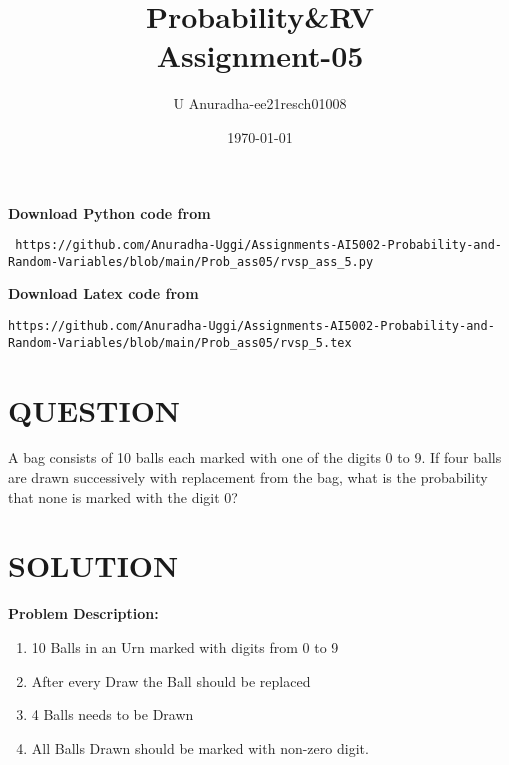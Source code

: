 \documentclass[journal,12pt,twocolumn]{IEEEtran}
\title{Probability\&RV \\ Assignment-05}
\author{U Anuradha-ee21resch01008}
\date{\today}
\begin{document}
\maketitle
\newpage
\bigskip
\renewcommand{\thefigure}{\theenumi}
\renewcommand{\thetable}{\theenumi}
\textbf{Download Python code from}
\begin{lstlisting}
 https://github.com/Anuradha-Uggi/Assignments-AI5002-Probability-and-Random-Variables/blob/main/Prob_ass05/rvsp_ass_5.py
\end{lstlisting}
\textbf{Download Latex code from}
\begin{lstlisting}
https://github.com/Anuradha-Uggi/Assignments-AI5002-Probability-and-Random-Variables/blob/main/Prob_ass05/rvsp_5.tex
\end{lstlisting}
\section{\textbf{QUESTION}}
A bag consists of 10 balls each marked with one of the digits 0 to 9. If four balls are drawn successively with replacement from the bag,
what is the probability that none is marked with the digit 0?
\section{\textbf{SOLUTION}}
\textbf{Problem  Description:}
\begin{enumerate}
    \item  10 Balls in an Urn  marked with  digits from 0 to 9\\
    \item After every Draw the Ball should be replaced  \\
    \item 4 Balls needs to be Drawn\\
    \item All Balls Drawn should be marked with non-zero digit.\\
\end{enumerate}
  
\end{document}
